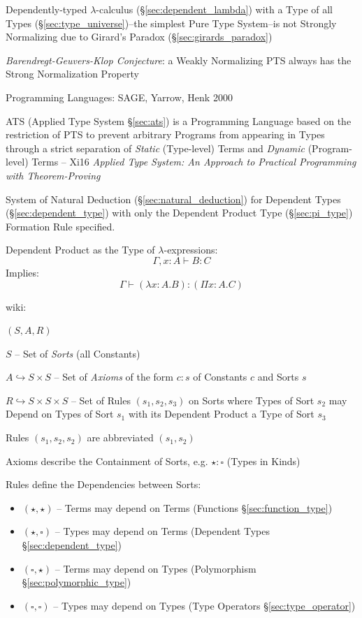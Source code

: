 Dependently-typed $\lambda$-calculus (\S\ref{sec:dependent_lambda})
with a Type of all Types (\S\ref{sec:type_universe})--the simplest
Pure Type System--is not Strongly Normalizing due to Girard's Paradox
(\S\ref{sec:girards_paradox})

\emph{Barendregt-Geuvers-Klop Conjecture}: a Weakly Normalizing PTS
always has the Strong Normalization Property

Programming Languages: SAGE, Yarrow, Henk 2000


\fist ATS (Applied Type System \S\ref{sec:ats}) is a Programming
Language based on the restriction of PTS to prevent arbitrary Programs
from appearing in Types through a strict separation of \emph{Static}
(Type-level) Terms and \emph{Dynamic} (Program-level) Terms -- Xi16
\emph{Applied Type System: An Approach to Practical Programming with
  Theorem-Proving}


System of Natural Deduction (\S\ref{sec:natural_deduction}) for
Dependent Types (\S\ref{sec:dependent_type}) with only the Dependent
Product Type (\S\ref{sec:pi_type}) Formation Rule specified.

Dependent Product as the Type of $\lambda$-expressions:
\[
  \Gamma,x:A \vdash B:C
\]
Implies:
\[
  \Gamma \vdash (\lambda x:A.B):(\Pi x:A.C)
\]


\asterism


wiki:

$(S,A,R)$

$S$ -- Set of \emph{Sorts} (all Constants)

$A \hookrightarrow S \times S$ -- Set of \emph{Axioms} of the form
$c:s$ of Constants $c$ and Sorts $s$

$R \hookrightarrow S \times S \times S$ -- Set of Rules
$(s_1,s_2,s_3)$ on Sorts where Types of Sort $s_2$ may Depend on Types
of Sort $s_1$ with its Dependent Product a Type of Sort $s_3$

Rules $(s_1,s_2,s_2)$ are abbreviated
$(s_1,s_2)$

Axioms describe the Containment of Sorts, e.g. $\star:\square$ (Types
in Kinds)

Rules define the Dependencies between Sorts:
\begin{itemize}
  \item $(\star,\star)$ -- Terms may depend on Terms (Functions
    \S\ref{sec:function_type})
  \item $(\star,\square)$ -- Types may depend on Terms (Dependent
    Types \S\ref{sec:dependent_type})
  \item $(\square,\star)$ -- Terms may depend on Types (Polymorphism
    \S\ref{sec:polymorphic_type})
  \item $(\square,\square)$ -- Types may depend on Types (Type
    Operators \S\ref{sec:type_operator})
\end{itemize}


